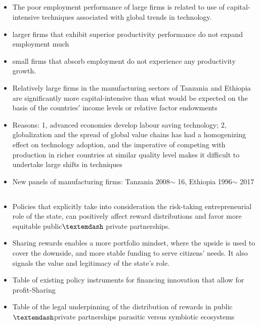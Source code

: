 \documentclass[10pt]{article} %
\begin{document}
    \subsection{\cite{DiaoElllisMcMillanRodrik2021}}
    \begin{itemize}
        \item The poor employment performance of large firms is related to use of capital-intensive techniques associated with global trends in technology.
        \item larger firms that exhibit superior productivity performance do not expand employment much
        \item small firms that absorb employment do not experience any productivity growth. 
        \item Relatively large firms in the manufacturing sectors of Tanzania and Ethiopia are significantly more capital-intensive than what would be expected on the basis of the countries$\prime$ income levels or relative factor endowments
        \item Reasons: 1, advanced economies develop labour saving technology; 2, globalization and the spread of global value chains has had a homogenizing effect on technology adoption, and the imperative of competing with production in richer countries at similar quality level makes it difficult to undertake large shifts in techniques
        \item New panels of manufacturing firms: Tanzania 2008$\sim$ 16, Ethiopia 1996$\sim$ 2017
    \end{itemize}

    \subsection{\cite{LaplaneMazzucato2020}}
    \begin{itemize}
        \item Policies that explicitly take into consideration the risk-taking entrepreneurial role of the state, can positively affect reward distributions and favor more equitable public$\textemdash$ private partnerships.
        \item Sharing rewards enables a more portfolio mindset, where the upside is used to cover the downside, and more stable funding to serve citizens' needs. It also signals the value and legitimacy of the state’s role.
        \item Table of existing policy instruments for financing innovation that allow for profit-Sharing
        \item Table of the legal underpinning of the distribution of rewards in public\(\textemdash\)private partnerships parasitic versus symbiotic ecosystems
    \end{itemize}
\end{document}
